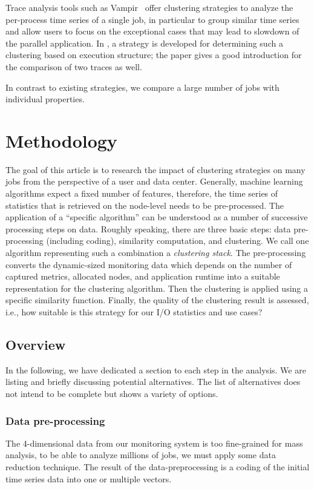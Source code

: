 \documentclass{jhps}
\begin{document}
Trace analysis tools such as Vampir~\cite{nagel1996vampir} offer clustering strategies to analyze the per-process time series of a single job, in particular to group similar time series and allow users to focus on the exceptional cases that may lead to slowdown of the parallel application.
In \cite{weber2016structural}, a strategy is developed for determining such a clustering based on execution structure; the paper gives a good introduction for the comparison of two traces as well.

In contrast to existing strategies, we compare a large number of jobs with individual properties.

\section{Methodology}%
\label{sec:methodology}

The goal of this article is to research the impact of clustering strategies on many jobs from the perspective of a user and data center.
Generally, machine learning algorithms expect a fixed number of features, therefore, the time series of statistics that is retrieved on the node-level needs to be pre-processed.
The application of a “specific algorithm” can be understood as a number of successive processing steps on data.
Roughly speaking, there are three basic steps: data pre-processing (including coding), similarity computation, and clustering.
We call one algorithm representing such a combination a \textit{clustering stack}.
The pre-processing converts the dynamic-sized monitoring data which depends on the number of captured metrics, allocated nodes, and application runtime into a suitable representation for the clustering algorithm.
Then the clustering is applied using a specific similarity function.
Finally, the quality of the clustering result is assessed, i.e., how suitable is this strategy for our I/O statistics and use cases?

\subsection{Overview}

In the following, we have dedicated a section to each step in the analysis.
We are listing and briefly discussing potential alternatives.
The list of alternatives does not intend to be complete but shows a variety of options.

\subsubsection{Data pre-processing}
The 4-dimensional data from our monitoring system is too fine-grained for mass analysis,
to be able to analyze millions of jobs, we must apply some data reduction technique.
The result of the data-preprocessing is a coding of the initial time series data into one or multiple vectors.
\end{document}
